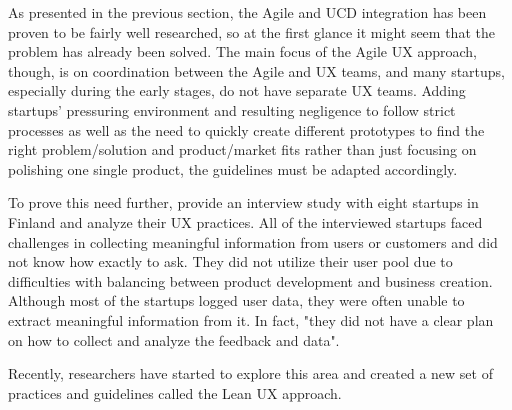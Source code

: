 \documentclass{article}
\begin{document}
As presented in the previous section, the Agile and UCD integration has been proven to be fairly well researched, so at the first glance it might seem that the problem has already been solved. The main focus of the Agile UX approach, though, is on coordination between the Agile and UX teams, and many startups, especially during the early stages, do not have separate UX teams. Adding startups' pressuring environment and resulting negligence to follow strict processes as well as the need to quickly create different prototypes to find the right problem/solution and product/market fits rather than just focusing on polishing one single product, the guidelines must be adapted accordingly.

To prove this need further, \cite{hokkanen2015ux} provide an interview study with eight startups in Finland and analyze their UX practices. All of the interviewed startups faced challenges in collecting meaningful information from users or customers and did not know how exactly to ask. They did not utilize their user pool due to difficulties with balancing between product development and business creation. Although most of the startups logged user data, they were often unable to extract meaningful information from it. In fact, "they did not have a clear plan on how to collect and analyze the feedback and data".

Recently, researchers have started to explore this area and created a new set of practices and guidelines called the Lean UX approach.
\end{document}
